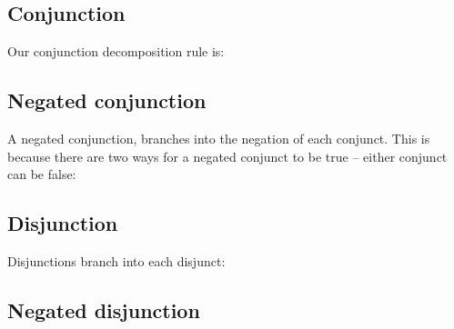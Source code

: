 \documentclass[PHIL101-Textbook.tex]{subfiles}
\begin{document}

\pagebreak

\subsection{Conjunction} 
\noindent Our conjunction decomposition rule is:



\subsection{Negated conjunction}

A negated conjunction, branches into the negation of each conjunct. This is because there are two ways for a negated conjunct to be true -- either conjunct can be false:



\subsection{Disjunction}
\label{subsec.DisjunctionTreeRule}
Disjunctions branch into each disjunct:



\subsection{Negated disjunction}
\end{document}
